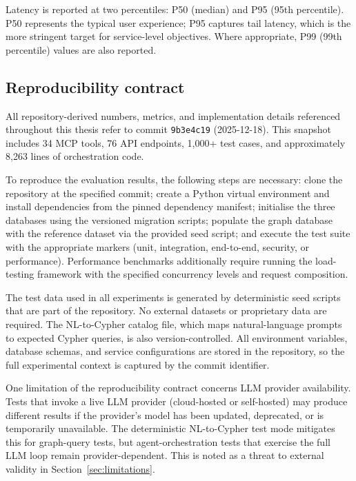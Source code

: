 \documentclass[a4paper,noexaminfo]{sapthesis}
\newcommand{\ToolCount}{34}
\newcommand{\EndpointCount}{76}
\newcommand{\TestCount}{1,000+}
\newcommand{\OrchestratorLOC}{8,263}
\begin{document}
Latency is reported at two percentiles: P50 (median) and P95 (95th
percentile).  P50 represents the typical user experience; P95 captures
tail latency, which is the more stringent target for service-level
objectives.  Where appropriate, P99 (99th percentile) values are also
reported.

\subsection{Reproducibility contract}
\label{sec:repro-contract}

All repository-derived numbers, metrics, and implementation details
referenced throughout this thesis refer to commit
\texttt{9b3e4c19} (2025-12-18).  This snapshot includes \ToolCount{} MCP tools,
\EndpointCount{} API endpoints, \TestCount{} test cases, and
approximately \OrchestratorLOC{} lines of orchestration code.

To reproduce the evaluation results, the following steps are necessary:
clone the repository at the specified commit; create a Python virtual
environment and install dependencies from the pinned dependency manifest;
initialise the three databases using the versioned migration scripts;
populate the graph database with the reference dataset via the provided
seed script; and execute the test suite with the appropriate markers
(unit, integration, end-to-end, security, or performance).  Performance
benchmarks additionally require running the load-testing framework with
the specified concurrency levels and request composition.

The test data used in all experiments is generated by deterministic seed
scripts that are part of the repository.  No external datasets or
proprietary data are required.  The NL-to-Cypher catalog file, which
maps natural-language prompts to expected Cypher queries, is also
version-controlled.  All environment variables, database schemas, and
service configurations are stored in the repository, so the full
experimental context is captured by the commit identifier.

One limitation of the reproducibility contract concerns LLM provider
availability.  Tests that invoke a live LLM provider (cloud-hosted or
self-hosted) may produce different results if the provider's model has
been updated, deprecated, or is temporarily unavailable.  The
deterministic NL-to-Cypher test mode mitigates this for graph-query tests,
but agent-orchestration tests that exercise the full LLM loop remain
provider-dependent.  This is noted as a threat to external validity in
Section~\ref{sec:limitations}.
\end{document}
